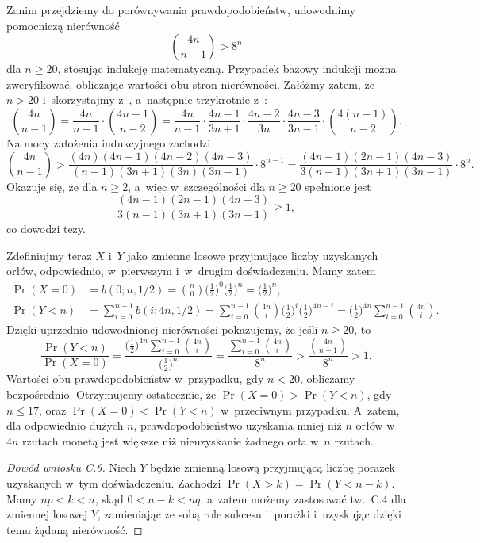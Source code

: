 
\exercise %
Zanim przejdziemy do porównywania prawdopodobieństw, udowodnimy pomocniczą nierówność
\[
    \binom{4n}{n-1} > 8^n
\]
dla $n\ge20$, stosując indukcję matematyczną.
Przypadek bazowy indukcji można zweryfikować, obliczając wartości obu stron nierówności.
Załóżmy zatem, że $n>20$ i~skorzystajmy z~, a~następnie trzykrotnie z~:
\[
    \binom{4n}{n-1} = \frac{4n}{n-1}\cdot\binom{4n-1}{n-2} = \frac{4n}{n-1}\cdot\frac{4n-1}{3n+1}\cdot\frac{4n-2}{3n}\cdot\frac{4n-3}{3n-1}\cdot\binom{4(n-1)}{n-2}.
\]
Na mocy założenia indukcyjnego zachodzi
\[
    \binom{4n}{n-1} > \frac{(4n)(4n-1)(4n-2)(4n-3)}{(n-1)(3n+1)(3n)(3n-1)}\cdot8^{n-1} = \frac{(4n-1)(2n-1)(4n-3)}{3(n-1)(3n+1)(3n-1)}\cdot8^n.
\]
Okazuje się, że dla $n\ge2$, a~więc w~szczególności dla $n\ge20$ spełnione jest
\[
    \frac{(4n-1)(2n-1)(4n-3)}{3(n-1)(3n+1)(3n-1)} \ge 1,
\]
co dowodzi tezy.

Zdefiniujmy teraz $X$ i~$Y$ jako zmienne losowe przyjmujące liczby uzyskanych orłów, odpowiednio, w~pierwszym i~w~drugim doświadczeniu.
Mamy zatem
\begin{align*}
	\Pr(X=0) &= b(0;n,1/2) = \binom{n}{0}\biggl(\frac{1}{2}\biggr)^0\biggl(\frac{1}{2}\biggr)^n = \biggl(\frac{1}{2}\biggr)^n, \\
	\Pr(Y<n) &= \sum_{i=0}^{n-1}b(i;4n,1/2) = \sum_{i=0}^{n-1}\binom{4n}{i}\biggl(\frac{1}{2}\biggr)^i\biggl(\frac{1}{2}\biggr)^{4n-i} = \biggl(\frac{1}{2}\biggr)^{4n}\sum_{i=0}^{n-1}\binom{4n}{i}.
\end{align*}
Dzięki uprzednio udowodnionej nierówności pokazujemy, że jeśli $n\ge20$, to
\[
    \frac{\Pr(Y<n)}{\Pr(X=0)} = \frac{\bigl(\frac{1}{2}\bigr)^{4n}\sum_{i=0}^{n-1}\binom{4n}{i}}{\bigl(\frac{1}{2}\bigr)^n} = \frac{\sum_{i=0}^{n-1}\binom{4n}{i}}{8^n} > \frac{\binom{4n}{n-1}}{8^n} > 1.
\]
Wartości obu prawdopodobieństw w~przypadku, gdy $n<20$, obliczamy bezpośrednio.
Otrzymujemy ostatecznie, że $\Pr(X=0)>\Pr(Y<n)$, gdy $n\le17$, oraz $\Pr(X=0)<\Pr(Y<n)$ w~przeciwnym przypadku.
A~zatem, dla odpowiednio dużych $n$, prawdopodobieństwo uzyskania mniej niż $n$ orłów w~$4n$ rzutach monetą jest większe niż nieuzyskanie żadnego orła w~$n$ rzutach.

\exercise %
\begin{proof}[Dowód wniosku C.6]
	Niech $Y$ będzie zmienną losową przyjmującą liczbę porażek uzyskanych w~tym doświadczeniu.
Zachodzi $\Pr(X>k)=\Pr(Y<n-k)$.
Mamy $np<k<n$, skąd $0<n-k<nq$, a~zatem możemy zastosować tw.\ C.4 dla zmiennej losowej $Y$, zamieniając ze sobą role sukcesu i~porażki i~uzyskując dzięki temu żądaną nierówność.
\end{proof}

